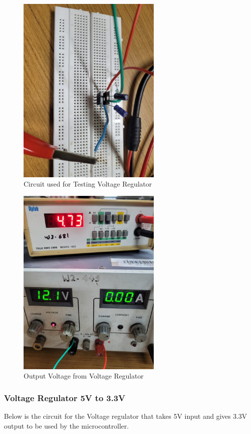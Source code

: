 \documentclass[12pt]{article}
\begin{document}
\begin{figure}[h]
    \centering
    \includegraphics[width=7cm]{Voltage_regulator2.jpeg}
    \caption{Circuit used for Testing Voltage Regulator}
    \label{fig:galaxy}
\end{figure}
\begin{figure}[h]
    \centering
    \includegraphics[width=7cm]{Voltage_regulator1.jpeg}
    \caption{Output Voltage from Voltage Regulator}
    \label{fig:galaxy}
\end{figure}

\subsubsection{Voltage Regulator 5V to 3.3V}
Below is the circuit for the Voltage regulator that takes 5V input and gives 3.3V output to be used by the microcontroller.
\end{document}
